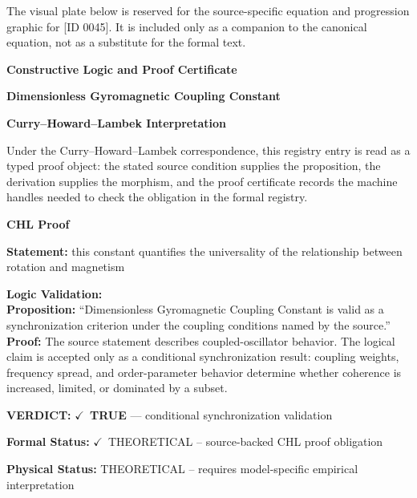 \begingroup\footnotesize\sloppy
The visual plate below is reserved for the source-specific equation and progression graphic for [ID 0045]. It is included only as a companion to the canonical equation, not as a substitute for the formal text.
\par\endgroup
\ifTZPDarkEdition
{}
\fi

\clearpage
\begingroup\tzpsupportsetup
\noindent\textbf{\fontsize{10.8pt}{12.8pt}\selectfont [ID 0045] Constructive Logic and Proof Certificate}\par
\noindent\textbf{\fontsize{10pt}{12pt}\selectfont Dimensionless Gyromagnetic Coupling Constant}\par
\vspace{0.45em}
\begingroup
\footnotesize
\setlength{\parskip}{0.22em}
\setlength{\parindent}{0pt}
\noindent\textbf{Curry--Howard--Lambek Interpretation}\par
Under the Curry--Howard--Lambek correspondence, this registry entry is read as a typed proof
object: the stated source condition supplies the proposition, the derivation supplies the
morphism, and the proof certificate records the machine handles needed to check the obligation
in the formal registry.

\vspace{0.45em}
\noindent\textbf{CHL Proof}\par
\textbf{Statement:} this constant quantifies the universality of the relationship between rotation and
magnetism

\textbf{Logic Validation:}\\
\textbf{Proposition:} ``Dimensionless Gyromagnetic Coupling Constant is valid as a synchronization criterion
under the coupling conditions named by the source.''\\
\textbf{Proof:} The source statement describes coupled-oscillator behavior. The logical claim is
accepted only as a conditional synchronization result: coupling weights, frequency
spread, and order-parameter behavior determine whether coherence is increased, limited,
or dominated by a subset.

\textbf{VERDICT:} \ensuremath{\checkmark}\ \textbf{TRUE} --- conditional synchronization validation

\textbf{Formal Status:} \ensuremath{\checkmark}\ THEORETICAL -- source-backed CHL proof obligation

\textbf{Physical Status:} THEORETICAL -- requires model-specific empirical interpretation
\par\vspace{0.45em}
\par
\ifTZPDarkEdition
{}
\fi
\endgroup
\endgroup
